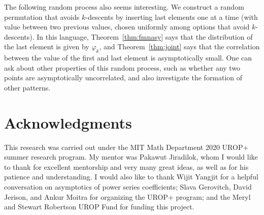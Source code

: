 \documentclass{amsart}
\theoremstyle{definition}
\begin{document}
The following random process also seems interesting. We construct a random permutation that avoids $k$-descents by inserting last elements one at a time (with value between two previous values, chosen uniformly among options that avoid $k$-descents). In this language, Theorem~\ref{thm:fmnasy} says that the distribution of the last element is given by $\varphi_k$, and Theorem~\ref{thm:joint} says that the correlation between the value of the first and last element is asymptotically small. One can ask about other properties of this random process, such as whether any two points are asymptotically uncorrelated, and also investigate the formation of other patterns.


\section{Acknowledgments}
This research was carried out under the MIT Math Department 2020 UROP+ summer research program. My mentor was Pakawut Jiradilok, whom I would like to thank for excellent mentorship and very many great ideas, as well as for his patience and understanding. I would also like to thank Wijit Yangjit for a helpful conversation on asymptotics of power series coefficients; Slava Gerovitch, David Jerison, and Ankur Moitra for organizing the UROP+ program; and the Meryl and Stewart Robertson UROP Fund for funding this project.



\end{document}
